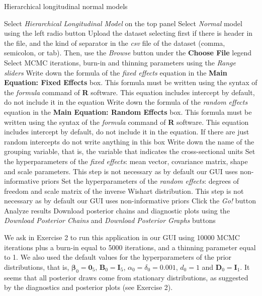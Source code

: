\begin{algorithm}[h!]
	\caption{Hierarchical longitudinal normal models}\label{alg:HLN}
	\begin{algorithmic}[1]  		 			
		\State Select \textit{Hierarchical Longitudinal Model} on the top panel
		\State Select \textit{Normal} model using the left radio button
		\State Upload the dataset selecting first if there is header in the file, and the kind of separator in the \textit{csv} file of the dataset (comma, semicolon, or tab). Then, use the \textit{Browse} button under the \textbf{Choose File} legend
		\State Select MCMC iterations, burn-in and thinning parameters using the \textit{Range sliders}
		\State Write down the formula of the \textit{fixed effects} equation in the \textbf{Main Equation: Fixed Effects} box. This formula must be written using the syntax of the \textit{formula} command of \textbf{R} software. This equation includes intercept by default, do not include it in the equation
		\State Write down the formula of the \textit{random effects} equation in the \textbf{Main Equation: Random Effects} box. This formula must be written using the syntax of the \textit{formula} command of \textbf{R} software. This equation includes intercept by default, do not include it in the equation. If there are just random intercepts do not write anything in this box
		\State Write down the name of the grouping variable, that is, the variable that indicates the cross-sectional units 
		\State Set the hyperparameters of the \textit{fixed effects}: mean vector, covariance matrix, shape and scale parameters. This step is not necessary as by default our GUI uses non-informative priors
		\State Set the hyperparameters of the \textit{random effects}: degrees of freedom and scale matrix of the inverse Wishart distribution. This step is not necessary as by default our GUI uses non-informative priors
		\State Click the \textit{Go!} button
		\State Analyze results
		\State Download posterior chains and diagnostic plots using the \textit{Download Posterior Chains} and \textit{Download Posterior Graphs} buttons
	\end{algorithmic} 
\end{algorithm}

We ask in Exercise 2 to run this application in our GUI using 10000 MCMC iterations plus a burn-in equal to 5000 iterations, and a thinning parameter equal to 1. We also used the default values for the hyperparameters of the prior distributions, that is, $\bm{\beta}_0=\bm{0}_5$, $\bm{B}_0=\bm{I}_5$, $\alpha_0=\delta_0=0.001$, $d_0=1$ and $\bm{D}_0=\bm{I}_1$. It seems that all posterior draws come from stationary distributions, as suggested by the diagnostics and posterior plots (see Exercise 2).

